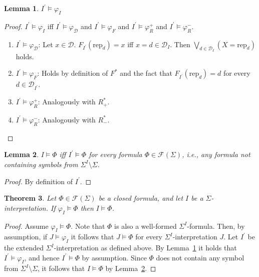 \documentclass{article}
\newtheorem{lemma}{Lemma}
\newtheorem{theorem}[lemma]{Theorem}
\begin{document}
\begin{lemma} \label{lemma1}
$I^\prime \models \varphi_I$
\end{lemma}
\begin{proof}
$I^\prime \models \varphi_I$ iff $I^\prime \models \varphi_\mathcal{D}$ and
$I^\prime \models \varphi_F$ and $I^\prime \models \varphi_R^+$ and $I^\prime \models \varphi_R^-$.
\begin{enumerate}
  \item $I^\prime \models \varphi_\mathcal{D}$: Let $x \in \mathcal{D}$.
        $F_{I^\prime}(\mathrm{rep}_d) = x$ iff $x = d \in \mathcal{D}_I$.
        Then $\bigvee_{d \in \mathcal{D}_I} \left( X = \mathrm{rep}_d \right)$ holds.
  \item $I^\prime \models \varphi_F$: Holds by definition of $F^*$ and the fact that $F_{I^\prime}(\mathrm{rep}_d) = d$ for every $d \in \mathcal{D}_{I^\prime}$.
  \item $I^\prime \models \varphi_R^+$: Analogously with $R^*_+$.
  \item $I^\prime \models \varphi_R^-$: Analogously with $R^*_-$.
\end{enumerate}
\end{proof}

\begin{lemma} \label{lemma2}
$I \models \Phi$ iff $I^\prime \models \Phi$ for every formula $\Phi \in \mathcal{F}(\Sigma)$, i.e., any formula not containing symbols from $\Sigma^I \setminus \Sigma$.
\end{lemma}
\begin{proof}
By definition of $I^\prime$.
\end{proof}

\begin{theorem}
Let $\Phi \in \mathcal{F}(\Sigma)$ be a closed formula, and let $I$ be a $\Sigma$-interpretation. If $\varphi_I \models \Phi$ then $I \models \Phi$.
\end{theorem}
\begin{proof}
Assume $\varphi_I \models \Phi$. 
Note that $\Phi$ is also a well-formed $\Sigma^I$-formula.
Then, by assumption, 
if $J \models \varphi_I$ it follows that $J \models \Phi$ for every
$\Sigma^I$-interpretation $J$.
Let $I^\prime$ be the extended $\Sigma^I$-interpretation as defined above.
By Lemma~\ref{lemma1} it holds that $I^\prime \models \varphi_I$, and hence
$I^\prime \models \Phi$ by assumption.
Since $\Phi$ does not contain any symbol from $\Sigma^I \setminus \Sigma$, it follows that $I \models \Phi$ by Lemma~\ref{lemma2}.
\end{proof}
\end{document}
